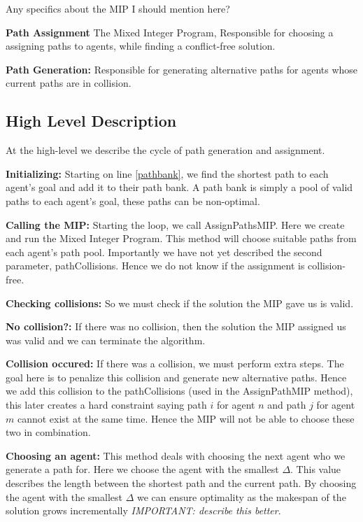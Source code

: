 \documentclass[a4paper,11pt]{article}
\begin{document}
Any specifics about the MIP I should mention here? 

\begin{compactenum}
	\item \textbf{Path Assignment} The Mixed Integer Program, Responsible for choosing a assigning paths to agents, while finding a conflict-free solution.
	\item \textbf{Path Generation:} Responsible for generating alternative paths for agents whose current paths are in collision.
\end{compactenum}

\subsection{High Level Description} \label{sec:high-level}
At the high-level we describe the cycle of path generation and assignment. 

\noindent \textbf{Initializing:} Starting on line \ref{pathbank}, we find the shortest path to each agent's goal and add it to their path bank. A path bank is simply a pool of valid paths to each agent's goal, these paths can be non-optimal.

\noindent \textbf{Calling the MIP:} Starting the loop, we call AssignPathsMIP. Here we create and run the Mixed Integer Program. This method will choose suitable paths from each agent's path pool. Importantly we have not yet described the second parameter, pathCollisions. Hence we do not know if the assignment is collision-free. 

\noindent \textbf{Checking collisions:} So we must check if the solution the MIP gave us is valid.

\noindent \textbf{No collision?:} If there was no collision, then the solution the MIP assigned us was valid and we can terminate the algorithm.

\noindent \textbf{Collision occured:} If there was a collision, we must perform extra steps. The goal here is to penalize this collision and generate new alternative paths. Hence we add this collision to the pathCollisions (used in the AssignPathMIP method), this later creates a hard constraint saying path $i$ for agent $n$ and path $j$ for agent $m$ cannot exist at the same time. Hence the MIP will not be able to choose these two in combination.

\noindent \textbf{Choosing an agent:} This method deals with choosing the next agent who we generate a path for. Here we choose the agent with the smallest $\Delta$. This value describes the length between the shortest path and the current path. By choosing the agent with the smallest $\Delta$ we can ensure optimality as the makespan of the solution grows incrementally \textit{IMPORTANT: describe this better}.
\end{document}
